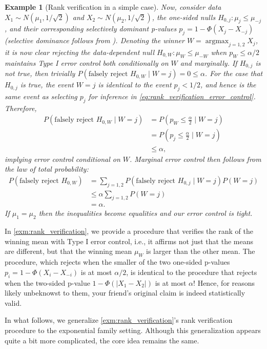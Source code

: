 \documentclass{article}
\DeclareMathOperator*{\argmax}{argmax}
\newtheorem{example}{Example}
\begin{document}
\begin{example}[Rank verification in a simple case]
Now, consider data $X_1 \sim N(\mu_1, 1/\sqrt{2})$ and $X_2 \sim N(\mu_2, 1/\sqrt{2})$, the one-sided nulls $H_{0, j}: \mu_j \leq \mu_{-j}$, and their corresponding selectively dominant p-values $p_j = 1 - \Phi(X_j - X_{-j})$ (selective dominance follows from ). Denoting the winner $W = \argmax_{j = 1, 2} X_j$, it is now clear rejecting the data-dependent null $H_{0, W}: \mu_W \leq \mu_{-W}$ when $p_{W} \leq \alpha/2$ maintains Type I error control both conditionally on $W$ and marginally. If $H_{0, j}$ is not true, then trivially $P(\text{falsely reject } H_{0, W} \mid W = j) = 0 \leq \alpha$. For the case that $H_{0, j}$ is true, the event $W=j$ is identical to the event $p_j < 1/2$, and hence is the same event as selecting $p_j$ for inference in \eqref{eq:rank_verification_error_control}. Therefore, 
\begin{align*}
    P(\text{falsely reject } H_{0, W} \mid W = j) &= P\left(p_W \leq \frac{\alpha}{2}  \mid W = j\right)\\
    &= P\left(p_j \leq \frac{\alpha}{2}  \mid W = j \right) \\
    &\leq \alpha,
\end{align*}
implying error control conditional on $W$. Marginal error control then follows from the law of total probability:
\begin{align*}
    P(\text{falsely reject } H_{0, W}) &= \sum_{j=1, 2} P(\text{falsely reject } H_{0, j} \mid W = j)P(W=j) \\
                                      &\leq \alpha \sum_{j = 1, 2} P(W=j)\\
                                      &=\alpha. 
\end{align*}
If $\mu_1 = \mu_2$ then the inequalities become equalities and our error control is tight. 
\end{example}

In \eqref{exm:rank_verification}, we provide a procedure that verifies the rank of the winning mean with Type I error control, i.e., it affirms not just that the means are different, but that the winning mean $\mu_W$ is larger than the other mean.  The procedure, which rejects when the smaller of the two one-sided p-values $p_i = 1 - \Phi(X_i - X_{-i})$ is at most $\alpha/2$, is identical to the procedure that rejects when the two-sided p-value $1 - \Phi(|X_1 - X_2|)$ is at most $\alpha$! Hence, for reasons likely unbeknowst to them, your friend's original claim is indeed statistically valid. 

In what follows, we generalize \eqref{exm:rank_verification}'s rank verification procedure to the exponential family setting. Although this generalization appears quite a bit more complicated, the core idea remains the same. 
\end{document}
